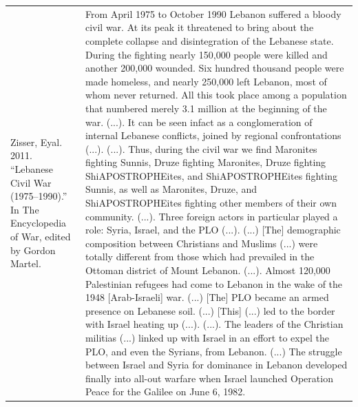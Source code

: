 {\begin{longtable}{p{}p{}}
Zisser, Eyal. 2011. “Lebanese Civil War (1975–1990).” In The Encyclopedia of War, edited by Gordon Martel. & From April 1975 to October 1990 Lebanon suffered a bloody civil war. At its peak it threatened to bring about the complete collapse and disintegration of the Lebanese state. During the fighting nearly 150,000 people were killed and another 200,000 wounded. Six hundred thousand people were made homeless, and nearly 250,000 left Lebanon, most of whom never returned. All this took place among a population that numbered merely 3.1 million at the beginning of the war. (...). It can be seen infact as a conglomeration of internal Lebanese conflicts, joined by regional confrontations (...). (...). Thus, during the civil war we find Maronites fighting Sunnis, Druze fighting Maronites, Druze fighting ShiAPOSTROPHEites, and ShiAPOSTROPHEites fighting Sunnis, as well as Maronites, Druze, and ShiAPOSTROPHEites fighting other members of their own community. (...). Three foreign actors in particular played a role: Syria, Israel, and the PLO (...). (...) [The] demographic composition between Christians and Muslims (...) were totally different from those which had prevailed in the Ottoman district of Mount Lebanon. (...). Almost 120,000 Palestinian refugees had come to Lebanon in the wake of the 1948 [Arab-Israeli] war. (...) [The] PLO became an armed presence on Lebanese soil. (...) [This] (...) led to the border with Israel heating up (...). (...). The leaders of the Christian militias (...) linked up with Israel in an effort to expel the PLO, and even the Syrians, from Lebanon. (...) The struggle between Israel and Syria for dominance in Lebanon developed finally into all-out warfare when Israel launched Operation Peace for the Galilee on June 6, 1982.
\\

\end{longtable}}
